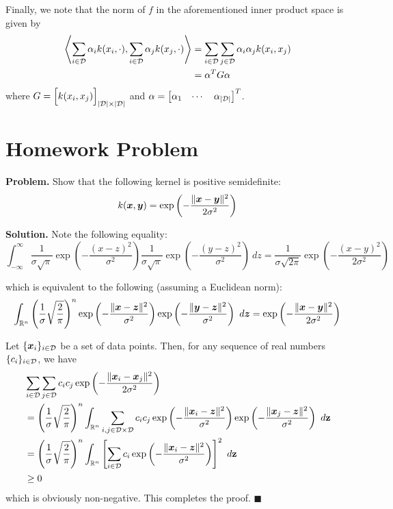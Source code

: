 \documentclass[12pt]{article}
\begin{document}
Finally, we note that the norm of $f$ in the aforementioned inner product space is given by 
\begin{align*}
    \left\langle\sum_{i\in{\cal D}}\alpha_ik(x_i,\cdot),\sum_{i\in{\cal D}}\alpha_jk(x_j,\cdot)\right\rangle &= \sum_{i\in{\cal D}}\sum_{j\in{\cal D}}\alpha_i\alpha_jk(x_i,x_j)\\
    &= \mathbf{\alpha}^TG\mathbf{\alpha}
\end{align*}
where $G = \Bigl[k(x_i,x_j)\Bigr]_{|{\cal D}|\times |{\cal D}|}$
and $\alpha = \begin{bmatrix}\alpha_1 & \cdots & \alpha_{|{\cal D}|}\end{bmatrix}^T$.
\section{Homework Problem}
\noindent\textbf{Problem.} Show that the following kernel is positive semidefinite:
\begin{equation*}
    k({\boldsymbol x},{\boldsymbol y}) = \exp\left(-\frac{\|{\boldsymbol x} - {\boldsymbol y}\|^2}{2\sigma^2}\right)
\end{equation*}

\noindent\textbf{Solution.} Note the following equality:
\begin{equation*}
    \int_{-\infty}^{\infty}\frac{1}{\sigma\sqrt{\pi}}\exp\left(-\frac{(x - z)^2}{\sigma^2}\right)\frac{1}{\sigma\sqrt{\pi}}\exp\left(-\frac{(y - z)^2}{\sigma^2}\right)~dz = \frac{1}{\sigma\sqrt{2\pi}}\exp\left(-\frac{(x - y)^2}{2\sigma^2}\right)
\end{equation*}

which is equivalent to the following (assuming a Euclidean norm):
\begin{equation*}
    \int_{\mathbb R^n} \left(\frac{1}{\sigma}\sqrt{\frac{2}{\pi}}\right)^n\exp\left(-\frac{\|{\boldsymbol x} - {\boldsymbol z}\|^2}{\sigma^2}\right)\exp\left(-\frac{\|{\boldsymbol y} - {\boldsymbol z}\|^2}{\sigma^2}\right)~d{\boldsymbol z} = \exp\left(-\frac{\|{\boldsymbol x} - {\boldsymbol y}\|^2}{2\sigma^2}\right)
\end{equation*}

Let $\{{\boldsymbol x}_i\}_{i\in{\cal D}}$ be a set of data points. Then, for any sequence of real numbers $\{c_i\}_{i\in{\cal D}}$, we have 
\begin{align*}
    &\sum_{i\in{\cal D}}\sum_{j\in{\cal D}}c_ic_j\exp\left(-\frac{\|{\boldsymbol x}_i-{\boldsymbol x}_j\|^2}{2\sigma^2}\right) \\
    &= \left(\frac{1}{\sigma}\sqrt{\frac{2}{\pi}}\right)^n\int_{\mathbb R^n}\sum_{i,j\in{\cal D}\times{\cal D}}c_ic_j\exp\left(-\frac{\|{\boldsymbol x}_i - {\boldsymbol z}\|^2}{\sigma^2}\right)\exp\left(-\frac{\|{\boldsymbol x}_j - {\boldsymbol z}\|^2}{\sigma^2}\right)~d\mathbf{z}\\
    &= \left(\frac{1}{\sigma}\sqrt{\frac{2}{\pi}}\right)^n\int_{\mathbb R^n}\left[\sum_{i\in{\cal D}}c_i\exp\left(-\frac{\|{\boldsymbol x}_i - {\boldsymbol z}\|^2}{\sigma^2}\right)\right]^2~d\mathbf{z}\\
    &\ge 0
\end{align*}
which is obviously non-negative. This completes the proof. $\blacksquare$
\end{document}

